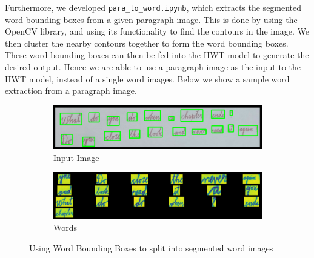 \documentclass[10pt,twocolumn,letterpaper]{article}
\begin{document}
Furthermore, we developed \href{https://github.com/Shambu-K/handwriting-generator-model/blob/main/Code/para_to_words.ipynb}{\texttt{para\_to\_word.ipynb}}, which extracts the segmented word bounding boxes from a given paragraph image. This is done by using the OpenCV library, and using its functionality to find the contours in the image. We then cluster the nearby contours together to form the word bounding boxes. These word bounding boxes can then be fed into the HWT model to generate the desired output. Hence we are able to use a paragraph image as the input to the HWT model, instead of a single word images. Below we show a sample word extraction from a paragraph image. 
\begin{figure}[h]
  \centering
  \begin{subfigure}[b]{0.4\textwidth}
    \includegraphics[width=\textwidth]{../latex-src/Images/Bounding_Box_Image.png}
    \caption{Input Image}
    \label{fig:bb_img}
  \end{subfigure}
  \hfill
  \begin{subfigure}[b]{0.4\textwidth}
    \includegraphics[width=\textwidth]{../latex-src/Images/Bounding_Box_Words.png}
    \caption{Words}
    \label{fig:bb_words}
  \end{subfigure}
  \caption{{Using Word Bounding Boxes to split into segmented word images}}
  \label{fig:bb}
\end{figure}
\end{document}
